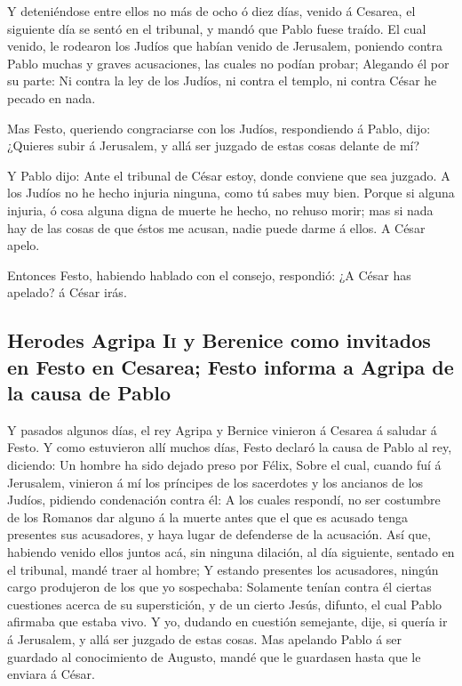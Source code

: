  Y deteniéndose entre ellos no más de ocho ó diez días,
venido á Cesarea, el siguiente día se sentó en el tribunal, y mandó que
Pablo fuese traído.  El cual venido, le rodearon los
Judíos que habían venido de Jerusalem, poniendo contra Pablo muchas y
graves acusaciones, las cuales no podían probar;  Alegando
él por su parte: Ni contra la ley de los Judíos, ni contra el templo, ni
contra César he pecado en nada.

 Mas Festo, queriendo congraciarse con los Judíos,
respondiendo á Pablo, dijo: ¿Quieres subir á Jerusalem, y allá ser
juzgado de estas cosas delante de mí?

 Y Pablo dijo: Ante el tribunal de César estoy, donde
conviene que sea juzgado. A los Judíos no he hecho injuria ninguna, como
tú sabes muy bien.  Porque si alguna injuria, ó cosa
alguna digna de muerte he hecho, no rehuso morir; mas si nada hay de las
cosas de que éstos me acusan, nadie puede darme á ellos. A César apelo.

 Entonces Festo, habiendo hablado con el consejo,
respondió: ¿A César has apelado? á César irás.

\hypertarget{herodes-agripa-ii-y-berenice-como-invitados-en-festo-en-cesarea-festo-informa-a-agripa-de-la-causa-de-pablo}{%
\subsection{\texorpdfstring{Herodes Agripa \textsc{Ii} y Berenice como
invitados en Festo en Cesarea; Festo informa a Agripa de la causa de
Pablo}{Herodes Agripa Ii y Berenice como invitados en Festo en Cesarea; Festo informa a Agripa de la causa de Pablo}}\label{herodes-agripa-ii-y-berenice-como-invitados-en-festo-en-cesarea-festo-informa-a-agripa-de-la-causa-de-pablo}}

 Y pasados algunos días, el rey Agripa y Bernice vinieron
á Cesarea á saludar á Festo.  Y como estuvieron allí
muchos días, Festo declaró la causa de Pablo al rey, diciendo: Un hombre
ha sido dejado preso por Félix,  Sobre el cual, cuando
fuí á Jerusalem, vinieron á mí los príncipes de los sacerdotes y los
ancianos de los Judíos, pidiendo condenación contra él: 
A los cuales respondí, no ser costumbre de los Romanos dar alguno á la
muerte antes que el que es acusado tenga presentes sus acusadores, y
haya lugar de defenderse de la acusación.  Así que,
habiendo venido ellos juntos acá, sin ninguna dilación, al día
siguiente, sentado en el tribunal, mandé traer al hombre;
 Y estando presentes los acusadores, ningún cargo
produjeron de los que yo sospechaba:  Solamente tenían
contra él ciertas cuestiones acerca de su superstición, y de un cierto
Jesús, difunto, el cual Pablo afirmaba que estaba vivo. 
Y yo, dudando en cuestión semejante, dije, si quería ir á Jerusalem, y
allá ser juzgado de estas cosas.  Mas apelando Pablo á
ser guardado al conocimiento de Augusto, mandé que le guardasen hasta
que le enviara á César.

